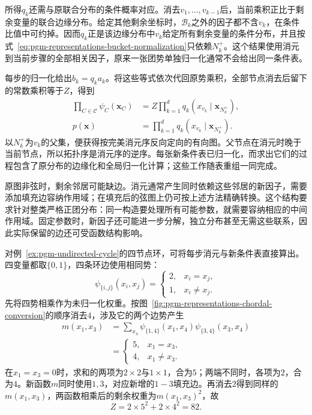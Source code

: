 所得$q_k$还需与原联合分布的条件概率对应。消去$v_1,\ldots,v_{k-1}$后，当前乘积正比于剩余变量的联合边缘分布。给定其他剩余坐标时，$\mathcal{B}_k$之外的因子都不含$v_k$，在条件比值中可约掉。因而$q_k$正是该边缘分布中$v_k$给定所有剩余变量的条件分布，并且按式~\eqref{eq:pgm-representations-bucket-normalization}只依赖$N_k^+$。这个结果使用消元到当前步骤的全部相关因子，原来一张团势单独归一化通常不会给出同一条件表。

每步的归一化给出$b_k=q_k a_k$。将这些等式依次代回原势乘积，全部节点消去后留下的常数乘积等于$Z$，得到
\begin{equation}
  \begin{aligned}
    \prod_{C\in\mathcal{C}}\psi_C(\bm{x}_C)
    &=Z\prod_{k=1}^d q_k(x_{v_k}\mid\bm{x}_{N_k^+}),\\
    p(\bm{x})&=\prod_{k=1}^d q_k(x_{v_k}\mid\bm{x}_{N_k^+}).
  \end{aligned}
  \label{eq:pgm-representations-telescoping-product}
\end{equation}
以$N_k^+$为$v_k$的父集，便获得按完美消元序反向定向的有向图。父节点在消元时晚于当前节点，所以拓扑序是消元序的逆序。每张新条件表已归一化，而求出它们的过程包含了原分布的边缘化和全局归一化计算；这些工作随表重组一同完成。

原图非弦时，剩余邻居可能缺边。消元通常产生同时依赖这些邻居的新因子，需要添加填充边容纳作用域；在填充后的弦图上仍可按上述方法精确转换。这个结构要求针对整类严格正团分布：同一构造要处理所有可能参数，就需要容纳相应的中间作用域。固定参数时，新因子还可能进一步分解，独立分布甚至无需这些联系，因此实际保留的边还可受函数结构影响。

对例~\ref{ex:pgm-undirected-cycle}的四节点环，可将每步消元与新条件表直接算出。四变量都取$\{0,1\}$，四条环边使用相同势：
\begin{equation}
  \psi_{\{i,j\}}(x_i,x_j)=
  \begin{cases}
    2,&x_i=x_j,\\
    1,&x_i\ne x_j.
  \end{cases}
  \label{eq:pgm-representations-cycle-potentials}
\end{equation}
先将四势相乘作为未归一化权重。按图~\ref{fig:pgm-representations-chordal-conversion}的顺序消去$4$，涉及它的两个边势产生
\begin{equation}
  \begin{aligned}
    m(x_1,x_3)
    &=\sum_{x_4}\psi_{\{1,4\}}(x_1,x_4)
    \psi_{\{3,4\}}(x_3,x_4)\\
    &=
    \begin{cases}
      5,&x_1=x_3,\\
      4,&x_1\ne x_3.
    \end{cases}
  \end{aligned}
  \label{eq:pgm-representations-cycle-message}
\end{equation}
在$x_1=x_3=0$时，求和的两项为$2\times2$与$1\times1$，合为$5$；两端不同时，各项为$2$，合为$4$。新函数$m$同时使用$1,3$，对应新增的$1-3$填充边。再消去$2$得到同样的$m(x_1,x_3)$，两函数相乘后的剩余权重为$m(x_1,x_3)^2$，故
\[
  Z=2\times5^2+2\times4^2=82.
\]


